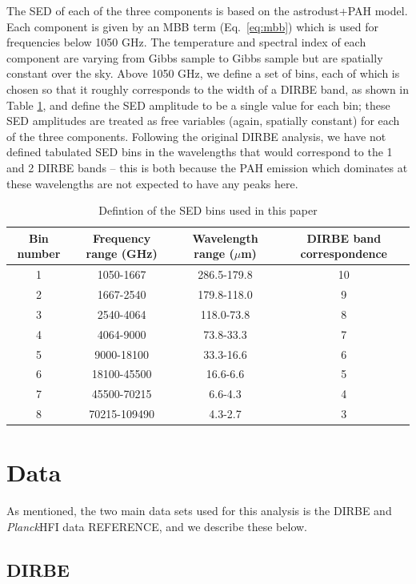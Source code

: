 \documentclass{aa}
\def\Planck{\textit{Planck}}
\begin{document}
The SED of each of the three components is based on the astrodust+PAH model. Each component is given by an MBB term (Eq.~\eqref{eq:mbb}) which is used for frequencies below 1050 GHz. The temperature and spectral index of each component are varying from Gibbs sample to Gibbs sample but are spatially constant over the sky. Above 1050 GHz, we define a set of bins, each of which is chosen so that it roughly corresponds to the width of a DIRBE band, as shown in Table \ref{tab:bins}, and define the SED amplitude to be a single value for each bin; these SED amplitudes are treated as free variables (again, spatially constant) for each of the three components. Following the original DIRBE analysis, we have not defined tabulated SED bins in the wavelengths that would correspond to the 1 and 2 DIRBE bands -- this is both because the PAH emission which dominates at these wavelengths are not expected to have any peaks here.


\begin{table}
    \label{tab:bins}
    \centering
    \caption{Defintion of the SED bins used in this paper}
    \begin{tabular}{c|c|c|c}
        Bin number & Frequency range (GHz) & Wavelength range ($\mu$m) & DIRBE band correspondence \\
        \hline
        1 & 1050-1667 & 286.5-179.8 & 10 \\
        2 & 1667-2540 & 179.8-118.0 & 9 \\
        3 & 2540-4064 & 118.0-73.8 & 8 \\
        4 & 4064-9000 & 73.8-33.3 & 7 \\
        5 & 9000-18100 & 33.3-16.6 & 6 \\
        6 & 18100-45500 & 16.6-6.6 & 5  \\
        7 & 45500-70215 & 6.6-4.3 & 4 \\
        8 & 70215-109490 & 4.3-2.7 & 3
    \end{tabular}
\end{table}

\clearpage
\section{Data}
As mentioned, the two main data sets used for this analysis is the DIRBE and \Planck HFI data REFERENCE, and we describe these below.
\subsection{DIRBE}
\end{document}

